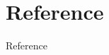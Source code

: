 \documentclass[aspectratio=169,10pt,xcolor={dvipsnames}]{beamer}
\begin{document}
    
    
    
    
    
    
    

\section{Reference}
\begin{frame}[allowframebreaks]{Reference}
  \tiny{
  
  }
  
\end{frame}

\end{document}
